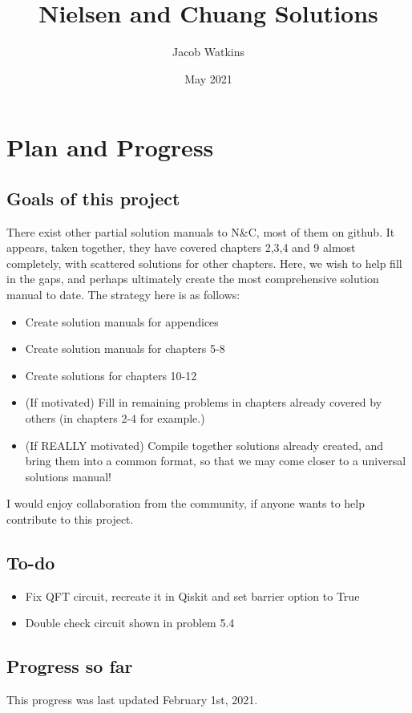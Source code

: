 \documentclass{book}
\title{Nielsen and Chuang Solutions}
\author{Jacob Watkins}
\date{May 2021}
\begin{document}
\maketitle
\chapter{Plan and Progress}
\section{Goals of this project}
There exist other partial solution manuals to N\&C, most of them on github. It appears, taken together, they have covered chapters 2,3,4 and 9 almost completely, with scattered solutions for other chapters. Here, we wish to help fill in the gaps, and perhaps ultimately create the most comprehensive solution manual to date. The strategy here is as follows:
\begin{itemize}
    \item Create solution manuals for appendices
    \item Create solution manuals for chapters 5-8
    \item Create solutions for chapters 10-12
    \item (If motivated) Fill in remaining problems in chapters already covered by others (in chapters 2-4 for example.)
    \item (If REALLY motivated) Compile together solutions already created, and bring them into a common format, so that we may come closer to a universal solutions manual!
\end{itemize}
I would enjoy collaboration from the community, if anyone wants to help contribute to this project. 
\section*{To-do}
\begin{itemize}
    \item Fix QFT circuit, recreate it in Qiskit and set barrier option to True
    \item Double check circuit shown in problem 5.4
\end{itemize}

\section{Progress so far}

This progress was last updated February 1st, 2021.
\end{document}
